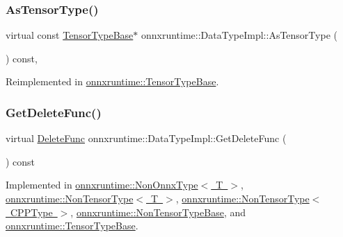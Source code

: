 \mbox{\label{classonnxruntime_1_1DataTypeImpl_ab333e8c93cf88915ad0dbf467efbae1b}} 
\subsubsection{\texorpdfstring{As\+Tensor\+Type()}{AsTensorType()}}
{\footnotesize\ttfamily virtual const \mbox{\hyperlink{classonnxruntime_1_1TensorTypeBase}{Tensor\+Type\+Base}}$\ast$ onnxruntime\+::\+Data\+Type\+Impl\+::\+As\+Tensor\+Type (\begin{DoxyParamCaption}{ }\end{DoxyParamCaption}) const\hspace{0.3cm}{\ttfamily [inline]}, {\ttfamily [virtual]}}



Reimplemented in \mbox{\hyperlink{classonnxruntime_1_1TensorTypeBase_aeadb9994879864d4bd1fcc8413d2545d}{onnxruntime\+::\+Tensor\+Type\+Base}}.

\mbox{\label{classonnxruntime_1_1DataTypeImpl_affe669c89722b1eb854f31d061a60e46}} 
\subsubsection{\texorpdfstring{Get\+Delete\+Func()}{GetDeleteFunc()}}
{\footnotesize\ttfamily virtual \mbox{\hyperlink{namespaceonnxruntime_a8dcea0e1aa8476e3d09d5a44a0ca4516}{Delete\+Func}} onnxruntime\+::\+Data\+Type\+Impl\+::\+Get\+Delete\+Func (\begin{DoxyParamCaption}{ }\end{DoxyParamCaption}) const\hspace{0.3cm}{\ttfamily [pure virtual]}}



Implemented in \mbox{\hyperlink{classonnxruntime_1_1NonOnnxType_a98dc87744e3754168fc7fa333401b873}{onnxruntime\+::\+Non\+Onnx\+Type$<$ T $>$}}, \mbox{\hyperlink{classonnxruntime_1_1NonTensorType_a5220a1a535891fcb0079befd7391062f}{onnxruntime\+::\+Non\+Tensor\+Type$<$ T $>$}}, \mbox{\hyperlink{classonnxruntime_1_1NonTensorType_a5220a1a535891fcb0079befd7391062f}{onnxruntime\+::\+Non\+Tensor\+Type$<$ C\+P\+P\+Type $>$}}, \mbox{\hyperlink{classonnxruntime_1_1NonTensorTypeBase_a09fc84f1ff38aa3bc4752a7560fcf902}{onnxruntime\+::\+Non\+Tensor\+Type\+Base}}, and \mbox{\hyperlink{classonnxruntime_1_1TensorTypeBase_a15a08f55ee78063dd91503a3db044171}{onnxruntime\+::\+Tensor\+Type\+Base}}.

